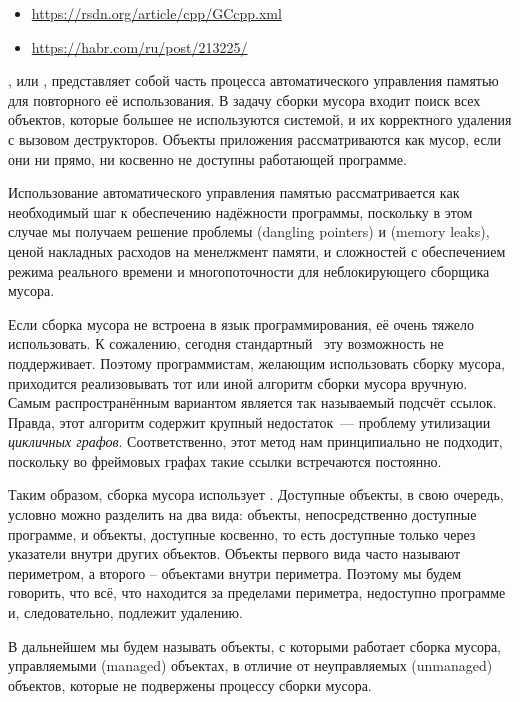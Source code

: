 \label{cppgc}

\begin{itemize}[nosep]
\item
\url{https://rsdn.org/article/cpp/GCcpp.xml}
\item 
\url{https://habr.com/ru/post/213225/}
\end{itemize}

, или ,
представляет собой часть процесса автоматического управления памятью для
повторного её использования. В задачу сборки мусора входит поиск всех объектов,
которые большее не используются системой, и их корректного удаления с вызовом
деструкторов. Объекты приложения рассматриваются как мусор, если они ни прямо,
ни косвенно не доступны работающей программе.

Использование автоматического управления памятью рассматривается как необходимый
шаг к обеспечению надёжности программы, поскольку в этом случае мы получаем
решение проблемы  (dangling pointers) и  (memory leaks), ценой накладных расходов на менелжмент памяти, и
сложностей с обеспечением режима реального времени и многопоточности для
неблокирующего сборщика мусора.

Если сборка мусора не встроена в язык программирования, её очень тяжело
использовать. К сожалению, сегодня стандартный \cpp\ эту возможность не
поддерживает. Поэтому программистам, желающим использовать сборку мусора,
приходится реализовывать тот или иной алгоритм сборки мусора вручную. Самым
распространённым вариантом является так называемый подсчёт ссылок. Правда, этот
алгоритм содержит крупный недостаток\ --- проблему утилизации \emph{цикличных
графов}. Соответственно, этот метод нам принципиально не подходит, поскольку во
фреймовых графах такие ссылки встречаются постоянно.

Таким образом, сборка мусора использует .
Доступные объекты, в свою очередь, условно можно разделить на два вида: объекты,
непосредственно доступные программе, и объекты, доступные косвенно, то есть
доступные только через указатели внутри других объектов. Объекты первого вида
часто называют периметром, а второго – объектами внутри периметра. Поэтому мы
будем говорить, что всё, что находится за пределами периметра, недоступно
программе и, следовательно, подлежит удалению.

В дальнейшем мы будем называть объекты, с которыми работает сборка мусора, управляемыми (managed) объектах, в отличие от неуправляемых (unmanaged) объектов, которые не подвержены процессу сборки мусора.
